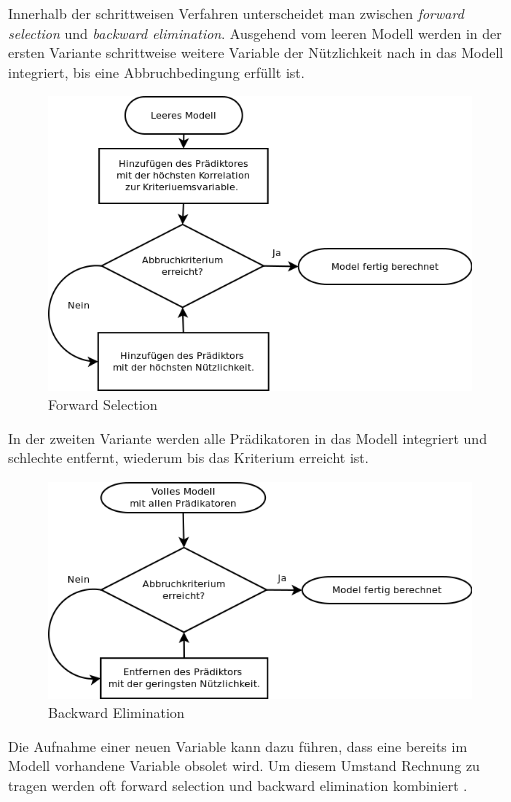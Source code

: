 \documentclass[english,12pt,doc]{apa}
\begin{document}
Innerhalb der schrittweisen Verfahren unterscheidet man zwischen \textit{forward selection} und \textit{backward elimination}. 
Ausgehend vom leeren Modell werden in der ersten Variante schrittweise weitere Variable der Nützlichkeit nach in das Modell integriert, bis eine Abbruchbedingung erfüllt ist. 
\begin{figure}[hb]
	\centering
	\includegraphics[width=\textwidth]{forward_stepwise.png}
	\caption{Forward Selection}
	\label{fig:forward_stepwise}
\end{figure}

In der zweiten Variante werden alle Prädikatoren in das Modell integriert und schlechte entfernt, wiederum bis das Kriterium erreicht ist. 
\begin{figure}[hbtb]
	\centering
	\includegraphics[width=\textwidth]{backward_stepwise.png}
	\caption{Backward Elimination}
	\label{fig:backward_stepwise}
\end{figure}

Die Aufnahme einer neuen Variable kann dazu führen, dass eine bereits im Modell vorhandene Variable obsolet wird. 
Um diesem Umstand Rechnung zu tragen werden oft forward selection und backward elimination kombiniert \cite[p. 461]{bortz2011}. 
\end{document}
